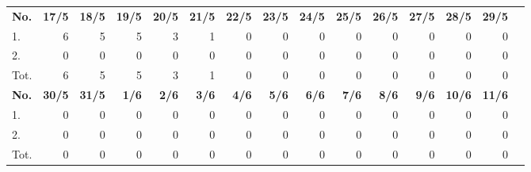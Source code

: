 \documentclass{article}
\begin{document}
\begin{table}[H]
    \centering
    \begin{tabularx}{\textwidth}{| X | r | r | r | r | r | r | r | r | r | r | r | r | r | r |}
        \Xhline{2pt}
        \textbf{No.} & \textbf{17/5} & \textbf{18/5} & \textbf{19/5} & \textbf{20/5} & \textbf{21/5} & \textbf{22/5} & \textbf{23/5} & \textbf{24/5} & \textbf{25/5} & \textbf{26/5} & \textbf{27/5} & \textbf{28/5} & \textbf{29/5} \\
        \Xhline{2pt}
        1. & 6 & 5 & 5 & 3 & 1 & 0 & 0 & 0 & 0 & 0 & 0 & 0 & 0 \\
        \hline
        2. & 0 & 0 & 0 & 0 & 0 & 0 & 0 & 0 & 0 & 0 & 0 & 0 & 0 \\
        \hline
        Tot. & 6 & 5 & 5 & 3 & 1 & 0 & 0 & 0 & 0 & 0 & 0 & 0 & 0 \\
        \Xhline{2pt}
        \textbf{No.} & \textbf{30/5} & \textbf{31/5} & \textbf{ 1/6} & \textbf{ 2/6} & \textbf{ 3/6} & \textbf{ 4/6} & \textbf{ 5/6} & \textbf{ 6/6} & \textbf{ 7/6} & \textbf{ 8/6} & \textbf{ 9/6} & \textbf{10/6} & \textbf{11/6} \\
        \Xhline{2pt}
        1. & 0 & 0 & 0 & 0 & 0 & 0 & 0 & 0 & 0 & 0 & 0 & 0 & 0 \\
        \hline
        2. & 0 & 0 & 0 & 0 & 0 & 0 & 0 & 0 & 0 & 0 & 0 & 0 & 0 \\
        \hline
        Tot. & 0 & 0 & 0 & 0 & 0 & 0 & 0 & 0 & 0 & 0 & 0 & 0 & 0 \\
        \hline
    \end{tabularx}
\end{table}

\clearpage
\end{document}
